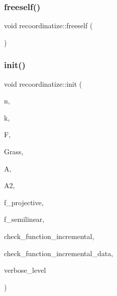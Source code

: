 \mbox{\label{classrecoordinatize_a54a3826523ae73370a2f4bee913e4cd0}} 
\subsubsection{\texorpdfstring{freeself()}{freeself()}}
{\footnotesize\ttfamily void recoordinatize\+::freeself (\begin{DoxyParamCaption}{ }\end{DoxyParamCaption})}

\mbox{\label{classrecoordinatize_ad4edc74b3a89f905b85f0fee7e9f3993}} 
\subsubsection{\texorpdfstring{init()}{init()}}
{\footnotesize\ttfamily void recoordinatize\+::init (\begin{DoxyParamCaption}\item[{\mbox{\hyperlink{galois_8h_a09fddde158a3a20bd2dcadb609de11dc}{I\+NT}}}]{n,  }\item[{\mbox{\hyperlink{galois_8h_a09fddde158a3a20bd2dcadb609de11dc}{I\+NT}}}]{k,  }\item[{\mbox{\hyperlink{classfinite__field}{finite\+\_\+field}} $\ast$}]{F,  }\item[{\mbox{\hyperlink{classgrassmann}{grassmann}} $\ast$}]{Grass,  }\item[{\mbox{\hyperlink{classaction}{action}} $\ast$}]{A,  }\item[{\mbox{\hyperlink{classaction}{action}} $\ast$}]{A2,  }\item[{\mbox{\hyperlink{galois_8h_a09fddde158a3a20bd2dcadb609de11dc}{I\+NT}}}]{f\+\_\+projective,  }\item[{\mbox{\hyperlink{galois_8h_a09fddde158a3a20bd2dcadb609de11dc}{I\+NT}}}]{f\+\_\+semilinear,  }\item[{\mbox{\hyperlink{galois_8h_a09fddde158a3a20bd2dcadb609de11dc}{I\+NT}}($\ast$)(\mbox{\hyperlink{galois_8h_a09fddde158a3a20bd2dcadb609de11dc}{I\+NT}} len, \mbox{\hyperlink{galois_8h_a09fddde158a3a20bd2dcadb609de11dc}{I\+NT}} $\ast$\mbox{\hyperlink{simeon_8_c_adab47f8243f1b5a2c31df2535d6b37d0}{S}}, void $\ast$data, \mbox{\hyperlink{galois_8h_a09fddde158a3a20bd2dcadb609de11dc}{I\+NT}} \mbox{\hyperlink{simeon_8_c_a818073fbcc2f439e7c56952f67386122}{verbose\+\_\+level}})}]{check\+\_\+function\+\_\+incremental,  }\item[{void $\ast$}]{check\+\_\+function\+\_\+incremental\+\_\+data,  }\item[{\mbox{\hyperlink{galois_8h_a09fddde158a3a20bd2dcadb609de11dc}{I\+NT}}}]{verbose\+\_\+level }\end{DoxyParamCaption})}

